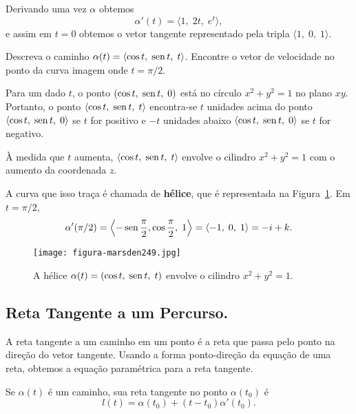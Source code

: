 \solo
Derivando uma vez \(\alpha\) obtemos
\begin{equation*}
\alpha'(t) = \langle 1,\; 2t,\; e^{t}\rangle,
\end{equation*}
e assim em \(t=0\) obtemos o vetor tangente representado pela tripla \(\langle 1,\;0,\;1\rangle\).

\begin{exc}\label{exer:1-06}
Descreva o caminho $\alpha(t) = \langle \cos t,\; \operatorname{sen} t,\; t \rangle$. Encontre o vetor de velocidade no ponto da curva imagem onde \(t = \pi/2\).
\end{exc}

\solo Para um dado \(t\), o ponto \((\cos t,\; \operatorname{sen} t,\; 0)\) está no círculo \(x^{2} + y^{2} = 1\) no plano \(xy\). Portanto, o ponto \(\langle \cos t,\; \operatorname{sen} t,\; t\rangle \) encontra-se \(t\) unidades acima do ponto \(\langle \cos t,\; \operatorname{sen} t,\; 0\rangle \) se \(t\) for positivo e \(-t\) unidades abaixo \(\langle \cos t,\; \operatorname{sen} t,\; 0\rangle\) se \(t\) for negativo.

À medida que \(t\) aumenta, \(\langle \cos t,\; \operatorname{sen} t,\; t\rangle \) envolve o cilindro \(x^{2} + y^{2} = 1\) com o aumento da coordenada \(z\).

A curva que isso traça é chamada de \textbf{hélice}, que é representada na Figura~\ref{fig:249}. Em \(t = \pi/2\),
\begin{equation*}
\alpha'(\pi/2) = \left\langle -\operatorname{sen} \frac{\pi}{2}, \cos \frac{\pi}{2},\; 1\right\rangle=\langle-1,\; 0,\; 1\rangle = -i + k.
\end{equation*}

\begin{figure}[H]
  \centering
  \texttt{[image: figura-marsden249.jpg]}
  \caption{A hélice \(\alpha(t) = (\cos t,\; \operatorname{sen} t,\; t)\) envolve o cilindro \(x^{2}+y^{2} = 1\).}
  \label{fig:249}
\end{figure}

%
\subsection*{Reta Tangente a um Percurso.}
%
A reta tangente a um caminho em um ponto é a reta que passa pelo ponto na direção do vetor tangente. Usando a forma ponto-direção da equação de uma reta, obtemos a equação paramétrica para a reta tangente.

Se \(\alpha(t)\) é um caminho, sua reta tangente no ponto \(\alpha(t_{0})\) é
\begin{equation*}
l(t) =\alpha(t_{0}) + (t-t_{0})\alpha'(t_{0}).
\end{equation*}

